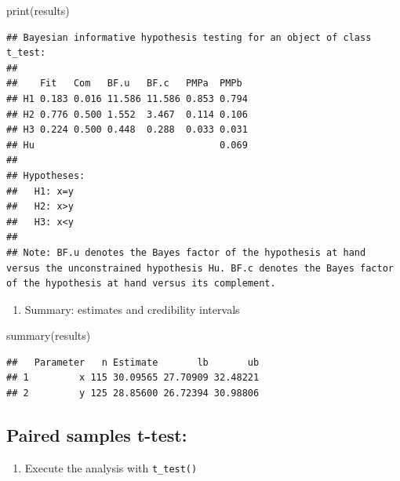 \documentclass[
]{book}
\newenvironment{Shaded}{\begin{snugshade}}{\end{snugshade}}
\newcommand{\AttributeTok}[1]{\textcolor[rgb]{0.77,0.63,0.00}{#1}}
\newcommand{\CommentTok}[1]{\textcolor[rgb]{0.56,0.35,0.01}{\textit{#1}}}
\newcommand{\ConstantTok}[1]{\textcolor[rgb]{0.00,0.00,0.00}{#1}}
\newcommand{\FunctionTok}[1]{\textcolor[rgb]{0.00,0.00,0.00}{#1}}
\newcommand{\NormalTok}[1]{#1}
\newcommand{\OtherTok}[1]{\textcolor[rgb]{0.56,0.35,0.01}{#1}}
\newcommand{\SpecialCharTok}[1]{\textcolor[rgb]{0.00,0.00,0.00}{#1}}
\providecommand{\tightlist}{%
  \setlength{\itemsep}{0pt}\setlength{\parskip}{0pt}}
\begin{document}
\begin{Shaded}
\begin{Highlighting}[]
\FunctionTok{print}\NormalTok{(results)}
\end{Highlighting}
\end{Shaded}

\begin{verbatim}
## Bayesian informative hypothesis testing for an object of class t_test:
## 
##    Fit   Com   BF.u   BF.c   PMPa  PMPb 
## H1 0.183 0.016 11.586 11.586 0.853 0.794
## H2 0.776 0.500 1.552  3.467  0.114 0.106
## H3 0.224 0.500 0.448  0.288  0.033 0.031
## Hu                                 0.069
## 
## Hypotheses:
##   H1: x=y
##   H2: x>y
##   H3: x<y
## 
## Note: BF.u denotes the Bayes factor of the hypothesis at hand versus the unconstrained hypothesis Hu. BF.c denotes the Bayes factor of the hypothesis at hand versus its complement.
\end{verbatim}

\begin{enumerate}
\def\labelenumi{\arabic{enumi})}
\setcounter{enumi}{3}
\tightlist
\item
  Summary: estimates and credibility intervals
\end{enumerate}

\begin{Shaded}
\begin{Highlighting}[]
\FunctionTok{summary}\NormalTok{(results)}
\end{Highlighting}
\end{Shaded}

\begin{verbatim}
##   Parameter   n Estimate       lb       ub
## 1         x 115 30.09565 27.70909 32.48221
## 2         y 125 28.85600 26.72394 30.98806
\end{verbatim}

\hypertarget{paired-samples-t-test}{%
\subsection{Paired samples t-test:}\label{paired-samples-t-test}}

\begin{enumerate}
\def\labelenumi{\arabic{enumi})}
\tightlist
\item
  Execute the analysis with \texttt{t\_test()}
\end{enumerate}

\begin{Shaded}
\end{Shaded}
\end{document}

